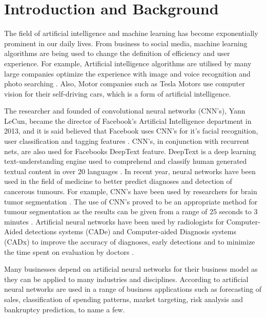 

\chapter{Introduction and Background} 
The field of artificial intelligence and machine learning has become exponentially prominent in our daily lives.
From business to social media, machine learning algorithms are being used to change the definition of efficiency and user experience.
For example, Artificial intelligence algorithms are utilised by many large companies optimize the experience with image and voice recognition and photo searching \citep{adit}. Also, Motor companies such as Tesla Motors use computer vision for their self-driving cars, which is a form of artificial intelligence. 

The researcher and founded of convolutional neural networks (CNN's), Yann LeCun, became the director of Facebook's Artificial Intelligence department in 2013, and it is said believed that Facebook uses CNN's for it's facial recognition, user classification and tagging features \citep{adit}. CNN's, in conjunction with recurrent nets, are also used for Facebooks DeepText feature. DeepText is a deep learning text-understanding engine used to comprehend and classify human generated textual content in over 20 languages \citep{DeepText}.
In recent year, neural networks have been used in the field of medicine to better predict diagnoses and detection of cancerous tumours. For example, CNN's have been used by researchers for brain tumor segmentation \citep{DBLP}. The use of CNN's proved to be an appropriate method for tumour segmentation as the results can be given from a range of 25 seconds to 3 minutes \citep{DBLP}. Artificial neural networks have been used by radiologists for Computer-Aided detections systems (CADe) and Computer-aided Diagnosis systems (CADx) to improve the accuracy of diagnoses, early detections and to minimize the time spent on evaluation by doctors \citep{CADe}. 

Many businesses depend on artificial neural networks for their business model as they can be applied to many industries and disciplines. According to \citet{geocities}
artificial neural networks are used in a range of business applications such as forecasting of sales, classification of spending patterns, market targeting, risk analysis and bankruptcy prediction, to name a few.


